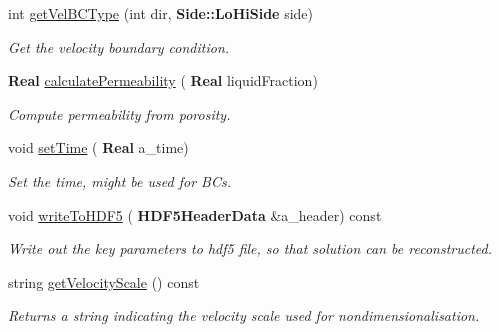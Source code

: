 \begin{DoxyCompactItemize}
int \hyperlink{class_mushy_layer_params_ae036d6b6250a955546827dd17b9f967c}{get\+Vel\+B\+C\+Type} (int dir, \textbf{ Side\+::\+Lo\+Hi\+Side} side)
\begin{DoxyCompactList}\small\item\em Get the velocity boundary condition. \end{DoxyCompactList}\item 
\mbox{\label{class_mushy_layer_params_a4b241acadb703afb0034a7bc39bdce00}} 
\textbf{ Real} \hyperlink{class_mushy_layer_params_a4b241acadb703afb0034a7bc39bdce00}{calculate\+Permeability} (\textbf{ Real} liquid\+Fraction)
\begin{DoxyCompactList}\small\item\em Compute permeability from porosity. \end{DoxyCompactList}\item 
\mbox{\label{class_mushy_layer_params_ab026a06d59c128d23f360e83cbd41eaa}} 
void \hyperlink{class_mushy_layer_params_ab026a06d59c128d23f360e83cbd41eaa}{set\+Time} (\textbf{ Real} a\+\_\+time)
\begin{DoxyCompactList}\small\item\em Set the time, might be used for B\+Cs. \end{DoxyCompactList}\item 
\mbox{\label{class_mushy_layer_params_a1313920d8997006fc94d4303f00976d5}} 
void \hyperlink{class_mushy_layer_params_a1313920d8997006fc94d4303f00976d5}{write\+To\+H\+D\+F5} (\textbf{ H\+D\+F5\+Header\+Data} \&a\+\_\+header) const
\begin{DoxyCompactList}\small\item\em Write out the key parameters to hdf5 file, so that solution can be reconstructed. \end{DoxyCompactList}\item 
\mbox{\label{class_mushy_layer_params_a6578a9bab6d277243d35455dfc4d641f}} 
string \hyperlink{class_mushy_layer_params_a6578a9bab6d277243d35455dfc4d641f}{get\+Velocity\+Scale} () const
\begin{DoxyCompactList}\small\item\em Returns a string indicating the velocity scale used for nondimensionalisation. \end{DoxyCompactList}\item 

\end{DoxyCompactItemize}
